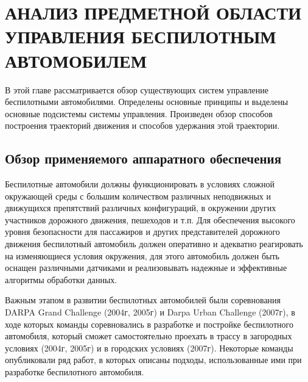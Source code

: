 \chapter{АНАЛИЗ ПРЕДМЕТНОЙ ОБЛАСТИ УПРАВЛЕНИЯ БЕСПИЛОТНЫМ АВТОМОБИЛЕМ}
В этой главе рассматривается обзор существующих систем управление беспилотными автомобилями.
Определены основные принципы и выделены основные подсистемы системы управления. Произведен
обзор способов построения траекторий движения и способов удержания этой траектории.

\section{Обзор применяемого аппаратного обеспечения}

Беспилотные автомобили должны функционировать в условиях сложной окружающей среды с большим
количеством различных неподвижных и движущихся препятствий различных конфигураций, в окружении
других участников дорожного движения, пешеходов и т.п. Для обеспечения высокого уровня
безопасности для пассажиров и других представителей дорожного движения беспилотный автомобиль
должен оперативно и адекватно реагировать на изменяющиеся условия окружения, для этого автомобиль
должен быть оснащен различными датчиками и реализовывать надежные и эффективные алгоритмы обработки данных.

Важным этапом в развитии беспилотных автомобилей были соревнования DARPA Grand Challenge (2004г, 2005г)
и Darpa Urban Challenge (2007г), в ходе которых команды соревновались в разработке и постройке
беспилотного автомобиля, который сможет самостоятельно проехать в трассу в загородных условиях
(2004г, 2005г) и в городских условиях (2007г). Некоторые команды опубликовали ряд работ, в
которых описаны подходы, использованные ими при разработке беспилотного автомобиля.

